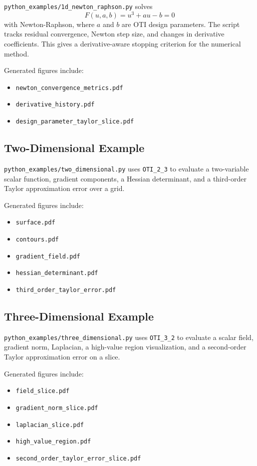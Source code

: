 \documentclass[11pt]{article}
\begin{document}
\texttt{python\_examples/1d\_newton\_raphson.py} solves
\[
    F(u,a,b) = u^3 + a u - b = 0
\]
with Newton-Raphson, where \(a\) and \(b\) are OTI design parameters. The
script tracks residual convergence, Newton step size, and changes in
derivative coefficients. This gives a derivative-aware stopping criterion for
the numerical method.

Generated figures include:

\begin{itemize}[noitemsep]
    \item \texttt{newton\_convergence\_metrics.pdf}
    \item \texttt{derivative\_history.pdf}
    \item \texttt{design\_parameter\_taylor\_slice.pdf}
\end{itemize}

\subsection{Two-Dimensional Example}

\texttt{python\_examples/two\_dimensional.py} uses \texttt{OTI\_2\_3} to
evaluate a two-variable scalar function, gradient components, a Hessian
determinant, and a third-order Taylor approximation error over a grid.

Generated figures include:

\begin{itemize}[noitemsep]
    \item \texttt{surface.pdf}
    \item \texttt{contours.pdf}
    \item \texttt{gradient\_field.pdf}
    \item \texttt{hessian\_determinant.pdf}
    \item \texttt{third\_order\_taylor\_error.pdf}
\end{itemize}

\subsection{Three-Dimensional Example}

\texttt{python\_examples/three\_dimensional.py} uses \texttt{OTI\_3\_2} to
evaluate a scalar field, gradient norm, Laplacian, a high-value region
visualization, and a second-order Taylor approximation error on a slice.

Generated figures include:

\begin{itemize}[noitemsep]
    \item \texttt{field\_slice.pdf}
    \item \texttt{gradient\_norm\_slice.pdf}
    \item \texttt{laplacian\_slice.pdf}
    \item \texttt{high\_value\_region.pdf}
    \item \texttt{second\_order\_taylor\_error\_slice.pdf}
\end{itemize}
\end{document}
